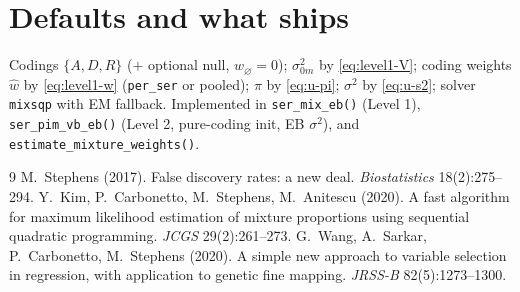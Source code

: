 \documentclass[11pt]{article}
\begin{document}
\section*{Defaults and what ships}
Codings $\{A,D,R\}$ ($+$ optional null, $w_\varnothing=0$); $\sigma_{0m}^2$ by
\eqref{eq:level1-V}; coding weights $\hat w$ by \eqref{eq:level1-w}
(\texttt{per\_ser} or pooled); $\pi$ by \eqref{eq:u-pi}; $\sigma^2$ by
\eqref{eq:u-s2}; solver \texttt{mixsqp} with EM fallback. Implemented in
\texttt{ser\_mix\_eb()} (Level 1), \texttt{ser\_pim\_vb\_eb()} (Level 2,
pure-coding init, EB $\sigma^2$), and \texttt{estimate\_mixture\_weights()}.

\begin{thebibliography}{9}
 M.~Stephens (2017). False discovery rates: a new deal.
\emph{Biostatistics} 18(2):275--294.
 Y.~Kim, P.~Carbonetto, M.~Stephens, M.~Anitescu (2020). A fast
algorithm for maximum likelihood estimation of mixture proportions using
sequential quadratic programming. \emph{JCGS} 29(2):261--273.
 G.~Wang, A.~Sarkar, P.~Carbonetto, M.~Stephens (2020). A simple
new approach to variable selection in regression, with application to genetic
fine mapping. \emph{JRSS-B} 82(5):1273--1300.
\end{thebibliography}
\end{document}
